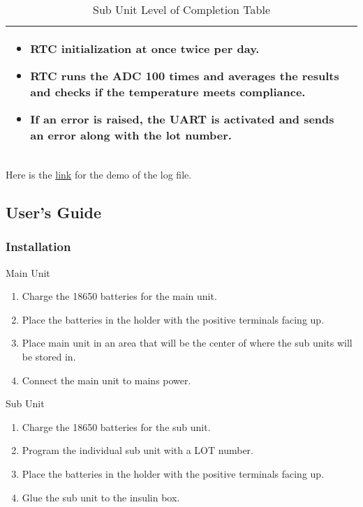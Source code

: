\begin{landscape}
\begin{table}[!ht]
\begin{tabularx}{\textwidth}{|X|X|}
\begin{itemize}
          \item RTC initialization at once twice per day.
          \item RTC runs the ADC 100 times and averages the results and checks if the temperature meets compliance.
          \item If an error is raised, the UART is activated and sends an error along with the lot number.
        \end{itemize}\\
      \hline
    \end{tabularx}
    \caption{Sub Unit Level of Completion Table}
    \label{tab:sub-unit-completion-table}
  \end{table}
\end{landscape}
Here is the \href{https://youtu.be/BvUFnom23P8}{link} for the demo of the log file.

\subsection{User’s Guide}
\subsubsection{Installation}
\large{Main Unit}
\normalsize
\linespread{2.0}
\begin{enumerate}
  \item Charge the 18650 batteries for the main unit.
  \item Place the batteries in the holder with the positive terminals facing up.
  \item Place main unit in an area that will be the center of where the sub units will be stored in.
  \item Connect the main unit to mains power.
\end{enumerate}
\large{Sub Unit}
\normalsize
\linespread{2.0}
\begin{enumerate}
  \item Charge the 18650 batteries for the sub unit.
  \item Program the individual sub unit with a LOT number.
  \item Place the batteries in the holder with the positive terminals facing up.
  \item Glue the sub unit to the insulin box.
\end{enumerate}
